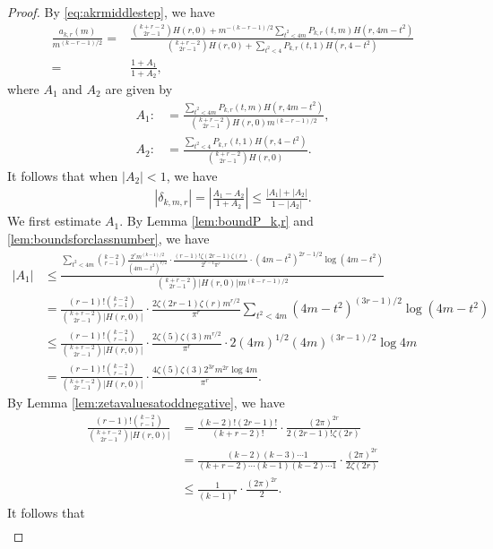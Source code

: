 \documentclass[11pt,letterpaper,reqno]{amsart}
\numberwithin{figure}{section}
\numberwithin{table}{section}
\theoremstyle{definition}
\theoremstyle{plain}
\theoremstyle{definition}
\theoremstyle{definition}
\theoremstyle{remark}
\numberwithin{equation}{section}
\theoremstyle{remark}
\begin{document}
\begin{proof}
By \eqref{eq:akrmiddlestep}, we have
\begin{align}
    \frac{a_{k,r}(m)}{m^{(k-r-1)/2}}
    =&\frac{\binom{k+r-2}{2r-1}H(r,0)+m^{-(k-r-1)/2}\sum_{t^2<4m}P_{k,r}(t,m)H(r,4m-t^2)}{\binom{k+r-2}{2r-1}H(r,0)+\sum_{t^2<4}P_{k,r}(t,1)H(r,4-t^2)}\\=&\frac{1+A_1}{1+A_2},
\end{align}
where $A_1$ and $A_2$ are given by
\begin{align}
    A_1:&=\frac{\sum_{t^2<4m}P_{k,r}(t,m)H(r,4m-t^2)}{\binom{k+r-2}{2r-1}H(r,0)m^{(k-r-1)/2}},\\A_2:&=\frac{\sum_{t^2<4}P_{k,r}(t,1)H(r,4-t^2)}{\binom{k+r-2}{2r-1}H(r,0)}.
\end{align}
It follows that when $|A_2|<1$, we have
\begin{align}|\delta_{k,m,r}|=\left|\frac{A_1-A_2}{1+A_2}\right|\leq\frac{|A_1|+|A_2|}{1-|A_2|}.\label{eq:md}\end{align}
We first estimate $A_1$. By Lemma \ref{lem:boundP_k,r} and \ref{lem:boundsforclassnumber}, we have
\begin{align}
|A_1|&\leq\frac{\sum_{t^2<4m}\binom{k-2}{r-1}\frac{2^rm^{(k-1)/2}}{(4m-t^2)^{r/2}}\cdot\frac{(r-1)!\zeta(2r-1)\zeta(r)}
   {2^{r-1}\pi^r}\cdot(4m-t^2)^{2r-1/2}\log(4m-t^2)}{\binom{k+r-2}{2r-1}|H(r,0)|m^{(k-r-1)/2}}   
\\&=\frac{(r-1)!\binom{k-2}{r-1}}{\binom{k+r-2}{2r-1}|H(r,0)|}\cdot\frac{2\zeta(2r-1)\zeta(r)m^{r/2}}{\pi^r}\sum_{t^2<4m}(4m-t^2)^{(3r-1)/2}\log(4m-t^2)\\&\leq\frac{(r-1)!\binom{k-2}{r-1}}{\binom{k+r-2}{2r-1}|H(r,0)|}\cdot\frac{2\zeta(5)\zeta(3)m^{r/2}}{\pi^r}\cdot2(4m)^{1/2}(4m)^{(3r-1)/2}\log4m\\&=\frac{(r-1)!\binom{k-2}{r-1}}{\binom{k+r-2}{2r-1}|H(r,0)|}\cdot\frac{4\zeta(5)\zeta(3)2^{3r}m^{2r}\log4m}{\pi^r}.
\end{align}
By Lemma \ref{lem:zetavaluesatoddnegative}, we have 
\begin{align}
    \frac{(r-1)!\binom{k-2}{r-1}}{\binom{k+r-2}{2r-1}|H(r,0)|}&=\frac{(k-2)!(2r-1)!}{(k+r-2)!}\cdot\frac{(2\pi)^{2r}}{
    2(2r-1)!\zeta(2r)}\\&=\frac{(k-2)(k-3)\cdots1}{(k+r-2)\cdots(k-1)(k-2)\cdots1}\cdot\frac{(2\pi)^{2r}}{2\zeta(2r)}\\&\leq\frac{1}{(k-1)^{r}}\cdot\frac{(2\pi)^{2r}}{2}.
\end{align}
It follows that 
\begin{align}

\end{align}
\end{proof}
\end{document}
